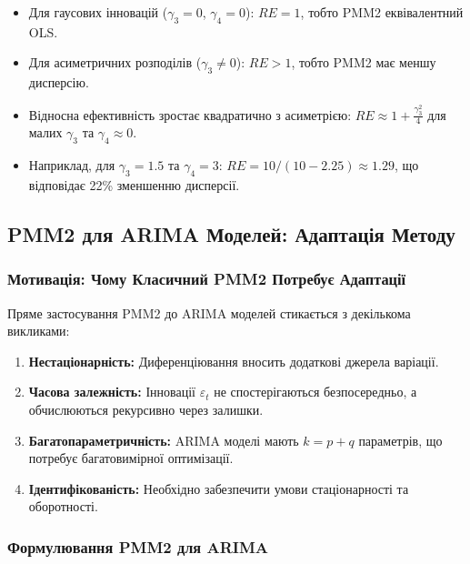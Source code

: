 \documentclass[12pt,a4paper]{article}
\begin{document}
\begin{itemize}
    \item Для гаусових інновацій ($\gamma_3 = 0$, $\gamma_4 = 0$): $RE = 1$, тобто PMM2 еквівалентний OLS.

    \item Для асиметричних розподілів ($\gamma_3 \neq 0$): $RE > 1$, тобто PMM2 має меншу дисперсію.

    \item Відносна ефективність зростає квадратично з асиметрією: $RE \approx 1 + \frac{\gamma_3^2}{4}$ для малих $\gamma_3$ та $\gamma_4 \approx 0$.

    \item Наприклад, для $\gamma_3 = 1.5$ та $\gamma_4 = 3$: $RE = 10/(10 - 2.25) \approx 1.29$, що відповідає 22\% зменшенню дисперсії.
\end{itemize}

\subsection{PMM2 для ARIMA Моделей: Адаптація Методу}
\label{subsec:pmm2_arima}

\subsubsection{Мотивація: Чому Класичний PMM2 Потребує Адаптації}

Пряме застосування PMM2 до ARIMA моделей стикається з декількома викликами:

\begin{enumerate}
    \item \textbf{Нестаціонарність:} Диференціювання вносить додаткові джерела варіації.

    \item \textbf{Часова залежність:} Інновації $\varepsilon_t$ не спостерігаються безпосередньо, а обчислюються рекурсивно через залишки.

    \item \textbf{Багатопараметричність:} ARIMA моделі мають $k = p + q$ параметрів, що потребує багатовимірної оптимізації.

    \item \textbf{Ідентифікованість:} Необхідно забезпечити умови стаціонарності та оборотності.
\end{enumerate}

\subsubsection{Формулювання PMM2 для ARIMA}
\end{document}
